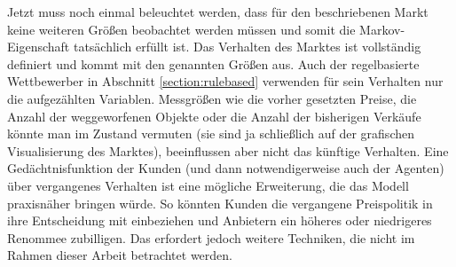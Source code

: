 Jetzt muss noch einmal beleuchtet werden, dass für den beschriebenen Markt keine weiteren Größen beobachtet werden müssen und somit die Markov-Eigenschaft tatsächlich erfüllt ist.
Das Verhalten des Marktes ist vollständig definiert und kommt mit den genannten Größen aus.
Auch der regelbasierte Wettbewerber in Abschnitt \ref{section:rulebased} verwenden für sein Verhalten nur die aufgezählten Variablen.
Messgrößen wie die vorher gesetzten Preise, die Anzahl der weggeworfenen Objekte oder die Anzahl der bisherigen Verkäufe könnte man im Zustand vermuten (sie sind ja schließlich auf der grafischen Visualisierung des Marktes), beeinflussen aber nicht das künftige Verhalten.
Eine Gedächtnisfunktion der Kunden (und dann notwendigerweise auch der Agenten) über vergangenes Verhalten ist eine mögliche Erweiterung, die das Modell praxisnäher bringen würde.
So könnten Kunden die vergangene Preispolitik in ihre Entscheidung mit einbeziehen und Anbietern ein höheres oder niedrigeres Renommee zubilligen.
Das erfordert jedoch weitere Techniken, die nicht im Rahmen dieser Arbeit betrachtet werden.

